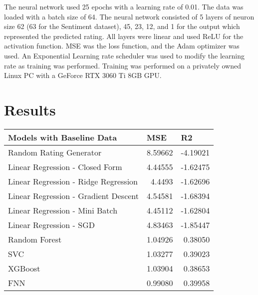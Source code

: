 \documentclass[11pt,letterpaper,oneside,titlepage]{article}
\begin{document}
The neural network used 25 epochs with a learning rate of 0.01. The data was loaded with a batch size of 64. The neural network consisted of 5 layers of neuron size 62 (63 for the Sentiment dataset), 45, 23, 12, and 1 for the output which represented the predicted rating. All layers were linear and used ReLU for the activation function. MSE was the loss function, and the Adam optimizer was used. An Exponential Learning rate scheduler was used to modify the learning rate as training was performed. Training was performed on a privately owned Linux PC with a GeForce RTX 3060 Ti 8GB GPU.

\section{Results}

\begin{center}
\begin{tabular}{|l|r|r|}
\hline
\textbf{Models with Baseline Data}                                & \multicolumn{1}{l|}{\textbf{MSE}}     & \multicolumn{1}{l|}{\textbf{R2}}       \\ \hline
Random Rating Generator                & \multicolumn{1}{l|}{8.59662} & \multicolumn{1}{l|}{-4.19021} \\ \hline
Linear Regression - Closed Form      & 4.44555                      & -1.62475                      \\ \hline
Linear Regression - Ridge Regression & 4.4493                       & -1.62696                      \\ \hline
Linear Regression - Gradient Descent & 4.54581                      & -1.68394                      \\ \hline
Linear Regression - Mini Batch       & 4.45112                      & -1.62804                      \\ \hline
Linear Regression - SGD              & 4.83463                      & -1.85447                      \\ \hline
Random Forest                        & 1.04926                      & 0.38050                       \\ \hline
SVC                                  & 1.03277                      & 0.39023                       \\ \hline
XGBoost                              & 1.03904                      & 0.38653                       \\ \hline
FNN                                  & 0.99080                      & 0.39958                       \\ \hline
\end{tabular}
    \captionsetup{justification=centering}
    \label{baseline}
\end{center}
\FloatBarrier
\end{document}
